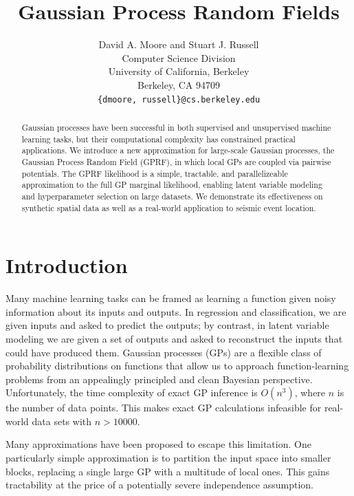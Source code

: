 \documentclass{article}
\begin{document}
\title{Gaussian Process Random Fields}

\author{
David A. Moore and Stuart J. Russell\\
Computer Science Division\\
University of California, Berkeley\\
Berkeley, CA 94709\\
\texttt{\{dmoore, russell\}@cs.berkeley.edu} 
}

\maketitle


\begin{abstract}
  Gaussian processes have been successful in both supervised and
  unsupervised machine learning tasks, but their computational
  complexity has constrained practical applications. We introduce a
  new approximation for large-scale Gaussian processes, the Gaussian
  Process Random Field (GPRF), in which local GPs are coupled via
  pairwise potentials. The GPRF likelihood is a simple, tractable, and
  parallelizeable approximation to the full GP marginal likelihood,
  enabling latent variable modeling and hyperparameter selection on
  large datasets.  We demonstrate its effectiveness on synthetic
  spatial data as well as a real-world application to seismic event
  location.
\end{abstract}

\section{Introduction}

Many machine learning tasks can be framed as learning a function given
noisy information about its inputs and outputs. In
regression and classification, we are given inputs and asked to
predict the outputs; by contrast, in latent variable modeling we are
given a set of outputs and asked to reconstruct the inputs that could
have produced them. Gaussian processes (GPs) are a flexible class of
probability distributions on functions that allow us to approach
function-learning problems from an appealingly principled and clean
Bayesian perspective. Unfortunately, the time complexity of exact GP
inference is $O(n^3)$, where $n$ is the number of data points. This makes exact GP calculations infeasible for
real-world data sets with $n > 10000$. 

Many approximations have been
proposed to escape this limitation. One particularly simple
approximation is to partition the input space into smaller blocks,
replacing a single large GP with a multitude of local ones. This gains
tractability at the price of a potentially severe independence assumption. 
\end{document}
